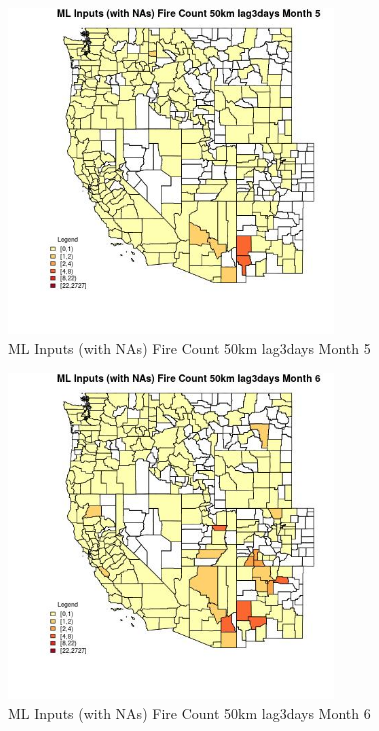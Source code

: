 \clearpage 

\begin{figure} 
\centering  
\includegraphics[width=0.77\textwidth]{Code_Outputs/Report_ML_input_PM25_Step4_part_f_de_duplicated_aves_prioritize_24hr_obswNAs_CountyFire_Count_50km_lag3daysmedianMonth5.jpg} 
\caption{\label{fig:Report_ML_input_PM25_Step4_part_f_de_duplicated_aves_prioritize_24hr_obswNAsCountyFire_Count_50km_lag3daysmedianMonth5}ML Inputs (with NAs) Fire Count 50km lag3days Month 5} 
\end{figure} 
 

\begin{figure} 
\centering  
\includegraphics[width=0.77\textwidth]{Code_Outputs/Report_ML_input_PM25_Step4_part_f_de_duplicated_aves_prioritize_24hr_obswNAs_CountyFire_Count_50km_lag3daysmedianMonth6.jpg} 
\caption{\label{fig:Report_ML_input_PM25_Step4_part_f_de_duplicated_aves_prioritize_24hr_obswNAsCountyFire_Count_50km_lag3daysmedianMonth6}ML Inputs (with NAs) Fire Count 50km lag3days Month 6} 
\end{figure} 
 

